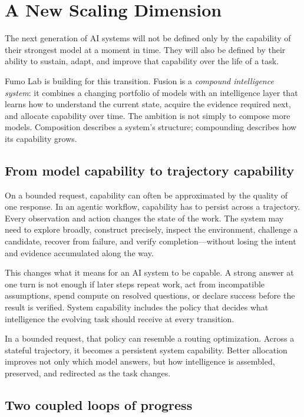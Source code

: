 \section{A New Scaling Dimension}

The next generation of AI systems will not be defined only by the capability of
their strongest model at a moment in time. They will also be defined by their
ability to sustain, adapt, and improve that capability over the life of a task.

Fumo Lab is building \systemname for this transition. Fusion is a
\emph{compound intelligence system}: it combines a changing portfolio of
models with an intelligence layer that learns how to understand the current
state, acquire the evidence required next, and allocate capability over time.
The ambition is not simply to compose more models. Composition describes a
system's structure; compounding describes how its capability grows.

\subsection{From model capability to trajectory capability}

On a bounded request, capability can often be approximated by the quality of one
response. In an agentic workflow, capability has to persist across a trajectory.
Every observation and action changes the state of the work. The system may need
to explore broadly, construct precisely, inspect the environment, challenge a
candidate, recover from failure, and verify completion---without losing the
intent and evidence accumulated along the way.

This changes what it means for an AI system to be capable. A strong answer at
one turn is not enough if later steps repeat work, act from incompatible
assumptions, spend compute on resolved questions, or declare success before the
result is verified. System capability includes the policy that decides what
intelligence the evolving task should receive at every transition.

In a bounded request, that policy can resemble a routing optimization. Across a
stateful trajectory, it becomes a persistent system capability. Better
allocation improves not only which model answers, but how intelligence is
assembled, preserved, and redirected as the task changes.

\subsection{Two coupled loops of progress}

